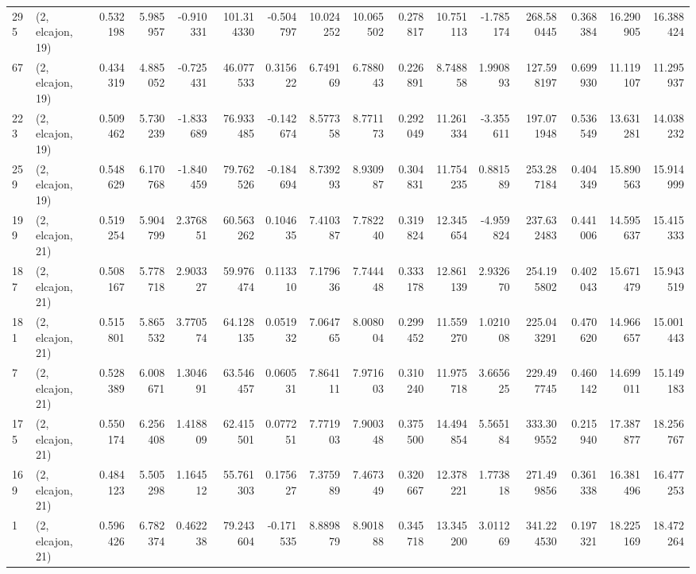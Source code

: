 \begin{tabular}{llrrrrrrrrrrrrrr}
295 &  (2, elcajon, 19) &   0.532198 &   5.985957 &  -0.910331 &   101.314330 &  -0.504797 &  10.024252 &  10.065502 &  0.278817 &  10.751113 &  -1.785174 &   268.580445 &   0.368384 &  16.290905 &  16.388424 \\
67  &  (2, elcajon, 19) &   0.434319 &   4.885052 &  -0.725431 &    46.077533 &   0.315622 &   6.749169 &   6.788043 &  0.226891 &   8.748858 &   1.990893 &   127.598197 &   0.699930 &  11.119107 &  11.295937 \\
223 &  (2, elcajon, 19) &   0.509462 &   5.730239 &  -1.833689 &    76.933485 &  -0.142674 &   8.577358 &   8.771173 &  0.292049 &  11.261334 &  -3.355611 &   197.071948 &   0.536549 &  13.631281 &  14.038232 \\
259 &  (2, elcajon, 19) &   0.548629 &   6.170768 &  -1.840459 &    79.762526 &  -0.184694 &   8.739293 &   8.930987 &  0.304831 &  11.754235 &   0.881589 &   253.287184 &   0.404349 &  15.890563 &  15.914999 \\
199 &  (2, elcajon, 21) &   0.519254 &   5.904799 &   2.376851 &    60.563262 &   0.104635 &   7.410387 &   7.782240 &  0.319824 &  12.345654 &  -4.959824 &   237.632483 &   0.441006 &  14.595637 &  15.415333 \\
187 &  (2, elcajon, 21) &   0.508167 &   5.778718 &   2.903327 &    59.976474 &   0.113310 &   7.179636 &   7.744448 &  0.333178 &  12.861139 &   2.932670 &   254.195802 &   0.402043 &  15.671479 &  15.943519 \\
181 &  (2, elcajon, 21) &   0.515801 &   5.865532 &   3.770574 &    64.128135 &   0.051932 &   7.064765 &   8.008004 &  0.299452 &  11.559270 &   1.021008 &   225.043291 &   0.470620 &  14.966657 &  15.001443 \\
7   &  (2, elcajon, 21) &   0.528389 &   6.008671 &   1.304691 &    63.546457 &   0.060531 &   7.864111 &   7.971603 &  0.310240 &  11.975718 &   3.665625 &   229.497745 &   0.460142 &  14.699011 &  15.149183 \\
175 &  (2, elcajon, 21) &   0.550174 &   6.256408 &   1.418809 &    62.415501 &   0.077251 &   7.771903 &   7.900348 &  0.375500 &  14.494854 &   5.565184 &   333.309552 &   0.215940 &  17.387877 &  18.256767 \\
169 &  (2, elcajon, 21) &   0.484123 &   5.505298 &   1.164512 &    55.761303 &   0.175627 &   7.375989 &   7.467349 &  0.320667 &  12.378221 &   1.773818 &   271.499856 &   0.361338 &  16.381496 &  16.477253 \\
1   &  (2, elcajon, 21) &   0.596426 &   6.782374 &   0.462238 &    79.243604 &  -0.171535 &   8.889879 &   8.901888 &  0.345718 &  13.345200 &   3.011269 &   341.224530 &   0.197321 &  18.225169 &  18.472264 \\

\end{tabular}
